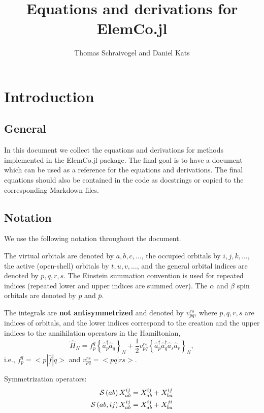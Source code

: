 \documentclass[a4paper,12pt,oneside]{book}
\newcommand{\op}{\hat}
\newcommand{\sop}[1]{{\cal S}\left(#1\right)}
\newcommand{\Sop}[2]{{\cal S}\left(#1,#2\right)}
\newcommand{\spa}[1]{{#1}}
\newcommand{\spb}[1]{\bar{#1}}
\newcommand{\ElemCojl}{\textsf{ElemCo.jl} }
\begin{document}
\title{Equations and derivations for \ElemCojl}
\author{Thomas Schraivogel and Daniel Kats}
\maketitle
\tableofcontents
\chapter{Introduction}
\section{General}
In this document we collect the equations and derivations for methods implemented in the \ElemCojl package.
The final goal is to have a document which can be used as a reference for the equations and derivations.
The final equations should also be contained in the code as docstrings or copied to the corresponding Markdown files.

\section{Notation}

We use the following notation throughout the document.

The virtual orbitals are denoted by $a,b,c,\ldots$, the occupied orbitals by $i,j,k,\ldots$,
the active (open-shell) orbitals by $t,u,v,\ldots$,
and the general orbital indices are denoted by $p,q,r,s$.
The Einstein summation convention is used for repeated indices (repeated lower and upper indices are summed over).
The $\alpha$ and $\beta$ spin orbitals are denoted by $\spa{p}$ and $\spb{p}$.

The integrals are \textbf{not antisymmetrized} and denoted by $v_{pq}^{rs}$, where $p,q,r,s$ are indices of orbitals,
and the lower indices correspond to the creation and the upper indices to the annihilation operators in the Hamiltonian,
\begin{equation}
  \op H_N = f_p^q \left\{\op a^\dagger_p \op a_q\right\}_N + 
  \frac{1}{2} v_{pq}^{rs} \left\{\op a^\dagger_p \op a^\dagger_q \op a_s \op a_r\right\}_N,
\end{equation}
i.e., $f_p^q = <p|\op f|q>$ and $v_{pq}^{rs} = <pq|rs>$.

Symmetrization operators:
\begin{equation}
\begin{aligned}
\sop{ab} X^{ij}_{ab} &= X^{ij}_{ab} + X^{ij}_{ba}\\
\Sop{ab}{ij} X^{ij}_{ab} &= X^{ij}_{ab} + X^{ji}_{ba}\\
\end{aligned}
\end{equation}
\end{document}
